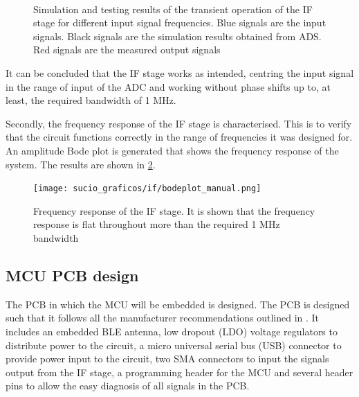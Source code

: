 \begin{figure}[htb]
	\centering
	 \\
	\caption{Simulation and testing results of the transient operation of the IF stage for different input signal frequencies. Blue signals are the input signals. Black signals are the simulation results obtained from ADS. Red signals are the measured output signals \label{fig:if_signal_test}}
\end{figure}

It can be concluded that the IF stage works as intended, centring the input signal in the range of input of the ADC and working without phase shifts up to, at least, the required bandwidth of 1 MHz.

Secondly, the frequency response of the IF stage is characterised. This is to verify that the circuit functions correctly in the range of frequencies it was designed for. An amplitude Bode plot is generated that shows the frequency response of the system. The results are shown in \cref{fig:if_bode}.

\begin{figure}[htb]
	\centering
	\texttt{[image: sucio\_graficos/if/bodeplot\_manual.png]}
	\caption{Frequency response of the IF stage. It is shown that the frequency response is flat throughout more than the required 1 MHz bandwidth}
	\label{fig:if_bode}
\end{figure}

\subsection{MCU PCB design}\label{sec:mcu-pcb-design}

The PCB in which the MCU will be embedded is designed. The PCB is designed such that it follows all the manufacturer recommendations outlined in \cite{STMicroelectronics2022, STMicroelectronics2022a, STMicroelectronics2022b}. It includes an embedded BLE antenna, low dropout (LDO) voltage regulators to distribute power to the circuit, a micro universal serial bus (USB) connector to provide power input to the circuit, two SMA connectors to input the signals output from the IF stage, a programming header for the MCU and several header pins to allow the easy diagnosis of all signals in the PCB.

